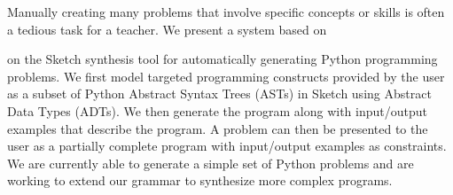 Manually creating many problems that involve specific concepts or skills is often a tedious task for a teacher. We present a system based on 

on the Sketch synthesis tool for automatically generating Python programming problems. We first model targeted programming constructs provided by the user as a subset of Python Abstract Syntax Trees (ASTs) in Sketch using Abstract Data Types (ADTs). We then generate the program along with input/output examples that describe the program. A problem can then be presented to the user as a partially complete program with input/output examples as constraints. We are currently able to generate a simple set of Python problems and are working to extend our grammar to synthesize more complex programs. 